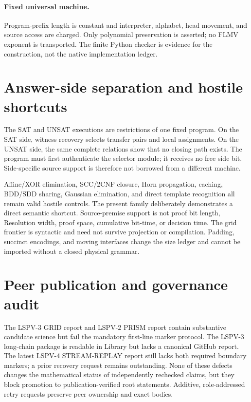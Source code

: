 \documentclass[11pt]{article}
\begin{document}
\paragraph{Fixed universal machine.}
Program-prefix length is constant and interpreter, alphabet, head movement,
and source access are charged.  Only polynomial preservation is asserted;
no FLMV exponent is transported.  The finite Python checker is evidence for
the construction, not the native implementation ledger.

\section{Answer-side separation and hostile shortcuts}
The SAT and UNSAT executions are restrictions of one fixed program.  On the
SAT side, witness recovery selects transfer pairs and local assignments.  On
the UNSAT side, the same complete relations show that no closing path exists.
The program must first authenticate the selector module; it receives no free
side bit.  Side-specific source support is therefore not borrowed from a
different machine.

Affine/XOR elimination, SCC/2CNF closure, Horn propagation, caching, BDD/SDD
sharing, Gaussian elimination, and direct template recognition all remain
valid hostile controls.  The present family deliberately demonstrates a
direct semantic shortcut.  Source-premise support is not proof bit length,
Resolution width, proof space, cumulative bit-time, or decision time.  The
grid frontier is syntactic and need not survive projection or compilation.
Padding, succinct encodings, and moving interfaces change the size ledger and
cannot be imported without a closed physical grammar.

\section{Peer publication and governance audit}
The LSPV-3 GRID report and LSPV-2 PRISM report contain substantive candidate
science but fail the mandatory first-line marker protocol.  The LSPV-3
long-chain package is readable in Library but lacks a canonical GitHub report.
The latest LSPV-4 STREAM-REPLAY report still lacks both required boundary
markers; a prior recovery request remains outstanding.  None of these defects
changes the mathematical status of independently rechecked claims, but they
block promotion to publication-verified root statements.  Additive,
role-addressed retry requests preserve peer ownership and exact bodies.
\end{document}
